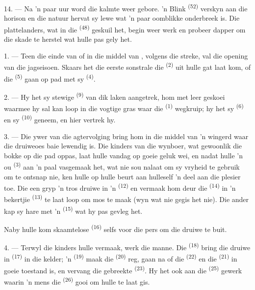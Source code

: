 14. --- Na 'n paar uur word die kalmte weer gebore. 'n Blink 
\textsuperscript{(52)} verskyn aan die horison en die natuur hervat sy lewe wat 'n paar
oomblikke onderbreek is. Die plattelanders, wat in die 
\textsuperscript{(48)} geskuil het, begin weer werk en probeer dapper om die skade te
herstel wat hulle pas gely het.

\VUsaut{6.0mm}
\VUsaut{3.6mm}

\VUsaut{1.4mm}
\VUsaut{4.0mm}

1. --- Teen die einde van  of in die middel van ,
volgens die streke, val die opening van die jagseisoen. Skaars het die eerste sonstrale
die  \textsuperscript{(2)} uit hulle gat laat kom, of die
 \textsuperscript{(5)} gaan op pad met sy 
\textsuperscript{(4)}.

2. --- Hy het sy stewige  \textsuperscript{(9)} van dik laken aangetrek,
hom met leer  geskoei waarmee hy sal kan loop in die vogtige gras waar
die  \textsuperscript{(1)} wegkruip; hy het sy 
\textsuperscript{(6)} en sy  \textsuperscript{(10)} geneem, en hier
vertrek hy.

3. --- Die ywer van die agtervolging bring hom in die middel van 'n wingerd waar die
druiweoes baie lewendig is. Die kinders van die wynboer, wat gewoonlik die bokke op die
pad oppas, laat hulle vandag op goeie geluk wei, en nadat hulle 'n ou 
\textsuperscript{(3)} aan 'n paal vasgemaak het, wat nie sou nalaat om sy vryheid te
gebruik om te ontsnap nie, ken hulle op hulle beurt aan hulleself 'n deel aan die plesier
toe. Die een gryp 'n tros druiwe in 'n  \textsuperscript{(12)} en
vermaak hom deur die  \textsuperscript{(14)} in 'n bekertjie
\textsuperscript{(13)} te laat loop om mos te maak (wyn wat nie gegis het nie). Die ander
kap sy hare met 'n  \textsuperscript{(15)} wat hy pas gevleg het.

Naby hulle kom skaamtelose  \textsuperscript{(16)} selfs voor die pers om
die druiwe te buit.

4. --- Terwyl die kinders hulle vermaak, werk die manne. Die 
\textsuperscript{(18)} bring die druiwe in  \textsuperscript{(17)}
in die kelder; 'n  \textsuperscript{(19)} maak die 
\textsuperscript{(20)} reg, gaan na of die  \textsuperscript{(22)} en die
 \textsuperscript{(21)} in goeie toestand is, en vervang die gebreekte
 \textsuperscript{(23)}. Hy het ook aan die 
\textsuperscript{(25)} gewerk waarin 'n mens die  \textsuperscript{(26)}
gooi om hulle te laat gis.

